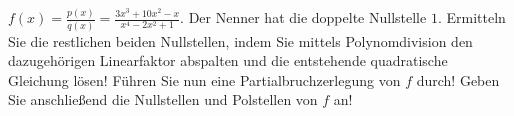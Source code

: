 \item $f(x) = \frac{p(x)}{q(x)} = \frac{3x^3+10x^2-x}{x^4-2x^2+1}$. Der Nenner hat die doppelte Nullstelle $1$. Ermitteln Sie die restlichen beiden Nullstellen, indem Sie mittels Polynomdivision den dazugehörigen Linearfaktor abspalten und die entstehende quadratische Gleichung lösen! Führen Sie nun eine Partialbruchzerlegung von $f$ durch! Geben Sie anschließend die Nullstellen und Polstellen von $f$ an!
